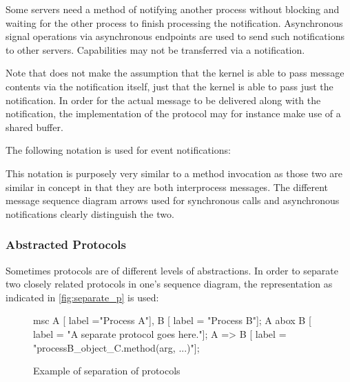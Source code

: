 Some servers need a method of notifying another process without blocking and waiting for the other process to finish processing the notification. Asynchronous signal operations via asynchronous endpoints are used to send such notifications to other servers. Capabilities may not be transferred via a notification.

Note that  does not make the assumption that the kernel is able to pass message contents via the notification itself, just that the kernel is able to pass just the notification. In order for the actual message to be delivered along with the notification, the implementation of the protocol may for instance make use of a shared buffer.

The following notation is used for event notifications:

\begin{center}
\end{center}

This notation is purposely very similar to a method invocation as those two are similar in concept in that they are both interprocess messages. The different message sequence diagram arrows used for synchronous calls and asynchronous notifications clearly distinguish the two.

\subsubsection*{Abstracted Protocols}

Sometimes protocols are of different levels of abstractions. In order to separate two closely related protocols in one's sequence diagram, the representation as indicated in \autoref{fig:separate_p} is used:

\begin{figure}[htb]
  \centering
  \begin{msc}
    msc {
      A [ label ="Process A"],
      B [ label = "Process B"];
      A abox B [ label = "A separate protocol goes here."];
      A => B [ label = "processB\_object\_C.method(arg, ...)"];
    }
  \end{msc}
  \caption{Example of separation of protocols}
  \label{fig:separate_p}
\end{figure}

